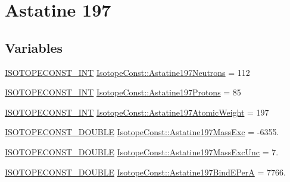\hypertarget{group___isotope_const-_astatine-_at197}{}\section{Astatine 197}
\label{group___isotope_const-_astatine-_at197}
\subsection*{Variables}
\begin{DoxyCompactItemize}
\item 
\mbox{\hyperlink{group___isotope_const-_macros_ga5f18360b3e99483a35c32d789e62621c}{I\+S\+O\+T\+O\+P\+E\+C\+O\+N\+S\+T\+\_\+\+I\+NT}} \mbox{\hyperlink{group___isotope_const-_astatine-_at197_gae1aa217fe1a118cec003fd9e848a0c36}{Isotope\+Const\+::\+Astatine197\+Neutrons}} = 112
\item 
\mbox{\hyperlink{group___isotope_const-_macros_ga5f18360b3e99483a35c32d789e62621c}{I\+S\+O\+T\+O\+P\+E\+C\+O\+N\+S\+T\+\_\+\+I\+NT}} \mbox{\hyperlink{group___isotope_const-_astatine-_at197_ga5345da5e54207878925e01589c359e46}{Isotope\+Const\+::\+Astatine197\+Protons}} = 85
\item 
\mbox{\hyperlink{group___isotope_const-_macros_ga5f18360b3e99483a35c32d789e62621c}{I\+S\+O\+T\+O\+P\+E\+C\+O\+N\+S\+T\+\_\+\+I\+NT}} \mbox{\hyperlink{group___isotope_const-_astatine-_at197_gab1e9682ec8222c77c43990cc6736916f}{Isotope\+Const\+::\+Astatine197\+Atomic\+Weight}} = 197
\item 
\mbox{\hyperlink{group___isotope_const-_macros_ga8f45a7272ce02c0b4c65c44636ed719a}{I\+S\+O\+T\+O\+P\+E\+C\+O\+N\+S\+T\+\_\+\+D\+O\+U\+B\+LE}} \mbox{\hyperlink{group___isotope_const-_astatine-_at197_gafe84b3266d937c8e0de33dac1443ae9a}{Isotope\+Const\+::\+Astatine197\+Mass\+Exc}} = -\/6355.
\item 
\mbox{\hyperlink{group___isotope_const-_macros_ga8f45a7272ce02c0b4c65c44636ed719a}{I\+S\+O\+T\+O\+P\+E\+C\+O\+N\+S\+T\+\_\+\+D\+O\+U\+B\+LE}} \mbox{\hyperlink{group___isotope_const-_astatine-_at197_ga74a44101696e18a4088b1a97d406f6f1}{Isotope\+Const\+::\+Astatine197\+Mass\+Exc\+Unc}} = 7.
\item 
\mbox{\hyperlink{group___isotope_const-_macros_ga8f45a7272ce02c0b4c65c44636ed719a}{I\+S\+O\+T\+O\+P\+E\+C\+O\+N\+S\+T\+\_\+\+D\+O\+U\+B\+LE}} \mbox{\hyperlink{group___isotope_const-_astatine-_at197_gac4d60c4e6121199f349b53fcf99a7159}{Isotope\+Const\+::\+Astatine197\+Bind\+E\+PerA}} = 7766.
\item 

\end{DoxyCompactItemize}
